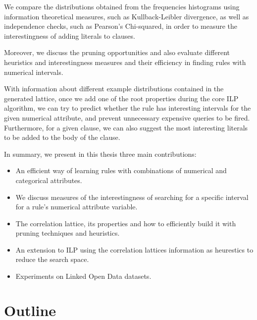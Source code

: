 We compare the distributions obtained from the frequencies histograms using information theoretical measures,
such as Kullback-Leibler divergence, as well as independence checks, such as Pearson's Chi-squared, in order to
measure the interestingness of adding literals to clauses.

Moreover, we discuss the pruning opportunities and also evaluate different heuristics and interestingness measures and
their efficiency in finding rules with numerical intervals. 

\begin{comment}
In a clause containing a numerical attribute in the body, we can obtain a support and confidence as well as support
value for each of the buckets. Therewith, we can search the most interesting intervals that satisfies the support and
confidence thresholds
\end{comment}

With information about different example distributions contained in the generated lattice, once we add one of the root
properties during the core ILP algorithm, we can try to predict whether the rule has interesting intervals for the
given numerical attribute, and prevent unnecessary expensive queries to be fired. Furthermore, for a given clause, we
can also suggest the most interesting literals to be added to the body of the clause.

In summary, we present in this thesis three main contributions:

\begin{itemize}

 \item An efficient way of learning rules with combinations of numerical and categorical attributes.
 \item We discuss measures of the interestingness of searching for a specific interval for a rule's numerical attribute
variable.
 \item The correlation lattice, its properties and how to efficiently build it with pruning techniques and heuristics.
 \item An extension to ILP using the correlation lattices information as heurestics to reduce the search space.
 \item Experiments on Linked Open Data datasets.
\end{itemize}


\section{Outline}

